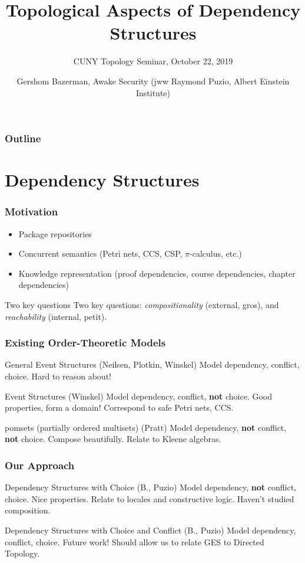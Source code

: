 \documentclass{beamer}
\title{Topological Aspects of Dependency Structures}
\subtitle{CUNY Topology Seminar, October 22, 2019}
\author{Gershom Bazerman, Awake Security \linebreak(jww Raymond Puzio, Albert Einstein Institute)}
\begin{document}
\begin{frame}
		\titlepage
\end{frame}
\begin{frame}
\frametitle{Outline}
\tableofcontents
\end{frame}

\section{Dependency Structures}

\begin{frame}
\frametitle{Motivation}
\begin{itemize}
\item Package repositories
\item Concurrent semantics (Petri nets, CCS, CSP, \(\pi\)-calculus, etc.)
\item Knowledge representation (proof dependencies, course dependencies, chapter dependencies)
\end{itemize}
\begin{block}{Two key questions}
Two key questions: \textit{compositionality} (external, gros), and \textit{reachability} (internal, petit).
\end{block}
\end{frame}

\begin{frame}
\frametitle{Existing Order-Theoretic Models}
\begin{block}{General Event Structures (Neilsen, Plotkin, Winskel)}
Model dependency, conflict, choice. Hard to reason about!
\end{block}
\begin{block}{Event Structures (Winskel)}
Model dependency, conflict, \textbf{not} choice. Good properties, form a domain! Correspond to safe Petri nets, CCS.
\end{block}
\begin{block}{pomsets (partially ordered multisets) (Pratt)}
Model dependency, \textbf{not} conflict, \textbf{not} choice. Compose beautifully. Relate to Kleene algebras.
\end{block}
\end{frame}

\begin{frame}
\frametitle{Our Approach}
\begin{block}{Dependency Structures with Choice (B., Puzio)}
Model dependency, \textbf{not} conflict, choice. Nice properties. Relate to locales and constructive logic. Haven't studied composition.
\end{block}
\begin{block}{Dependency Structures with Choice and Conflict (B., Puzio)}
Model dependency, conflict, choice. Future work! Should allow us to relate GES to Directed Topology.
\end{block}
\end{frame}
\end{document}
